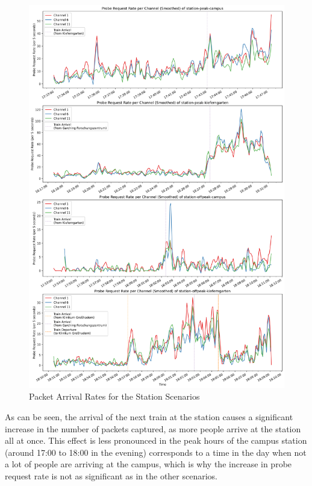 \documentclass[sigconf,nonacm]{acmart}
\begin{document}
\begin{figure}
    \centering
    \includegraphics[width=\columnwidth]{images/part1/probe-rate/station-scenarios.png}
    \caption{Packet Arrival Rates for the Station Scenarios}
    \label{fig:station_packet_arrival_rate}
\end{figure}

As can be seen, the arrival of the next train at the station causes a significant increase in the number of packets captured, as more people arrive at the station all at once. This effect is less pronounced in the peak hours of the campus station (around 17:00 to 18:00 in the evening) corresponds to a time in the day when not a lot of people are arriving at the campus, which is why the increase in probe request rate is not as significant as in the other scenarios.
\end{document}
